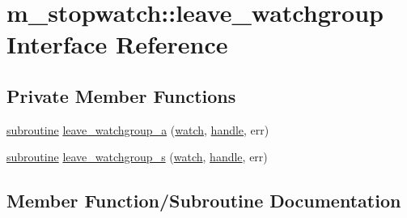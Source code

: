 \hypertarget{interfacem__stopwatch_1_1leave__watchgroup}{}\section{m\+\_\+stopwatch\+:\+:leave\+\_\+watchgroup Interface Reference}
\label{interfacem__stopwatch_1_1leave__watchgroup}
\subsection*{Private Member Functions}
\begin{DoxyCompactItemize}
\item 
\hyperlink{M__stopwatch_83_8txt_acfbcff50169d691ff02d4a123ed70482}{subroutine} \hyperlink{interfacem__stopwatch_1_1leave__watchgroup_ae226ae09e45e5469ad6b2e717edb019a}{leave\+\_\+watchgroup\+\_\+a} (\hyperlink{read__watch_83_8txt_ad2129669fa47b8899641309620add095}{watch}, \hyperlink{leave__watchgroup_83_8txt_ad6c5ebd26f707ef8da754021612a7c8d}{handle}, err)
\item 
\hyperlink{M__stopwatch_83_8txt_acfbcff50169d691ff02d4a123ed70482}{subroutine} \hyperlink{interfacem__stopwatch_1_1leave__watchgroup_aeb899a166591374378bbc81cf1e486f5}{leave\+\_\+watchgroup\+\_\+s} (\hyperlink{read__watch_83_8txt_ad2129669fa47b8899641309620add095}{watch}, \hyperlink{leave__watchgroup_83_8txt_ad6c5ebd26f707ef8da754021612a7c8d}{handle}, err)
\end{DoxyCompactItemize}


\subsection{Member Function/\+Subroutine Documentation}
\mbox{\label{interfacem__stopwatch_1_1leave__watchgroup_ae226ae09e45e5469ad6b2e717edb019a}} 
